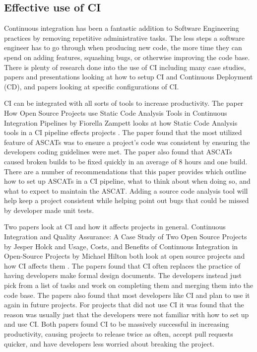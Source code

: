 \subsection{Effective use of CI}
	Continuous integration has been a fantastic addition to Software Engineering practices by removing repetitive administrative tasks. The less steps a software engineer has to go through when 
    producing new code, the more time they can spend on adding features, squashing bugs, or otherwise improving the code base. There is plenty of research done into the use of CI 
    including many case studies, papers and presentations looking at how to setup CI and Continuous Deployment (CD), and papers looking at specific configurations of CI.
	
	CI can be integrated with all sorts of tools to increase productivity. The paper How Open Source Projects use Static Code Analysis Tools in Continuous Integration Pipelines by Fiorella Zampett 
    looks at how Static Code Analysis tools in a CI pipeline effects projects \cite{Zampetti}. The paper found that the most utilized feature of ASCATs was to ensure a project's code was consistent 
    by ensuring the developers coding guidelines were met. The paper also found that ASCATs caused broken builds to be fixed quickly in an average of 8 hours and one build. There are a number of 
    recommendations that this paper provides which outline how to set up ASCATs in a CI pipeline, what to think about when doing so, and what to expect to maintain the ASCAT. Adding a source code 
    analysis tool will help keep a project consistent while helping point out bugs that could be missed by developer made unit tests.

	Two papers look at CI and how it affects projects in general. Continuous Integration and Quality Assurance: A Case Study of Two Open Source Projects by Jesper Holck and Usage, Costs, and Benefits
    of Continuous Integration in Open-Source Projects by Michael Hilton both look at open source projects and how CI affects them \cite{Hilton,Holck}. The papers found that CI often replaces the 
    practice of having developers make formal design documents. The developers instead just pick from a list of tasks and work on completing them and merging them into the code base. The papers also
    found that most developers like CI and plan to use it again in future projects. For projects that did not use CI it was found that the reason was usually just that the developers were not 
    familiar with how to set up and use CI. Both papers found CI to be massively successful in increasing productivity, causing projects to release twice as often, accept pull requests quicker, and have 
    developers less worried about breaking the project. 

